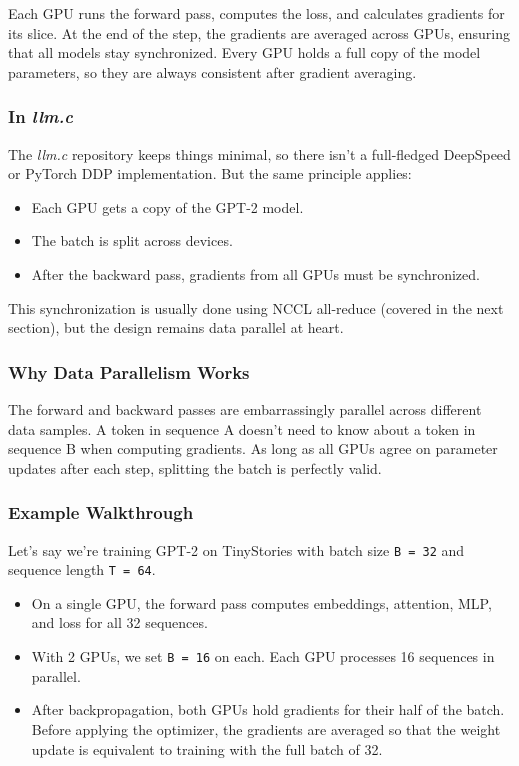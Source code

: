 \documentclass[
  letterpaper,
  DIV=11,
  numbers=noendperiod]{scrreprt}
\providecommand{\tightlist}{%
  \setlength{\itemsep}{0pt}\setlength{\parskip}{0pt}}
\begin{document}
Each GPU runs the forward pass, computes the loss, and calculates
gradients for its slice. At the end of the step, the gradients are
averaged across GPUs, ensuring that all models stay synchronized. Every
GPU holds a full copy of the model parameters, so they are always
consistent after gradient averaging.

\subsubsection{\texorpdfstring{In
\emph{llm.c}}{In llm.c}}\label{in-llm.c-1}

The \emph{llm.c} repository keeps things minimal, so there isn't a
full-fledged DeepSpeed or PyTorch DDP implementation. But the same
principle applies:

\begin{itemize}
\tightlist
\item
  Each GPU gets a copy of the GPT-2 model.
\item
  The batch is split across devices.
\item
  After the backward pass, gradients from all GPUs must be synchronized.
\end{itemize}

This synchronization is usually done using NCCL all-reduce (covered in
the next section), but the design remains data parallel at heart.

\subsubsection{Why Data Parallelism
Works}\label{why-data-parallelism-works}

The forward and backward passes are embarrassingly parallel across
different data samples. A token in sequence A doesn't need to know about
a token in sequence B when computing gradients. As long as all GPUs
agree on parameter updates after each step, splitting the batch is
perfectly valid.

\subsubsection{Example Walkthrough}\label{example-walkthrough-4}

Let's say we're training GPT-2 on TinyStories with batch size
\texttt{B\ =\ 32} and sequence length \texttt{T\ =\ 64}.

\begin{itemize}
\tightlist
\item
  On a single GPU, the forward pass computes embeddings, attention, MLP,
  and loss for all 32 sequences.
\item
  With 2 GPUs, we set \texttt{B\ =\ 16} on each. Each GPU processes 16
  sequences in parallel.
\item
  After backpropagation, both GPUs hold gradients for their half of the
  batch. Before applying the optimizer, the gradients are averaged so
  that the weight update is equivalent to training with the full batch
  of 32.
\end{itemize}
\end{document}
